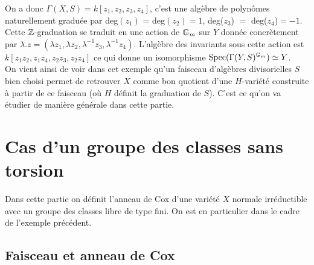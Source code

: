 On a donc $\Gamma(X, S)=k[z_1,z_2,z_3,z_4]$, c'est une algèbre de polynômes naturellement graduée par deg$(z_1)$ = deg$(z_2)=1$, deg($z_3$) $=$ deg($z_4$)$=-1$. Cette $\mathbb{Z}$-graduation se traduit en une action de $\mathbb{G}_m$ sur $Y$ donnée  concrètement par $\lambda.z=(\lambda z_1,\lambda z_2,\lambda^{-1} z_3,\lambda^{-1} z_4)$. L'algèbre des invariants sous cette action est $k[z_1z_2,z_1z_4,z_2z_3,z_2z_4]$ ce qui donne un isomorphisme $\operatorname{Spec}(\Gamma(Y,S)^{\mathbb{G}_m})\simeq Y$.\\ 
On vient ainsi de voir dans cet exemple qu'un faisceau d'algèbres divisorielles $S$ bien choisi permet de retrouver $X$ comme bon quotient d'une $H$-variété construite à partir de ce faisceau (où $H$ définit la graduation de $S$). C'est ce qu'on va étudier de manière générale dans cette partie.

\section{Cas d'un groupe des classes sans torsion}

Dans cette partie on définit l'anneau de Cox d'une variété $X$ normale irréductible avec un groupe des classes libre de type fini. On est en particulier dans le cadre de l'exemple précédent.

\subsection{Faisceau et anneau de Cox}


